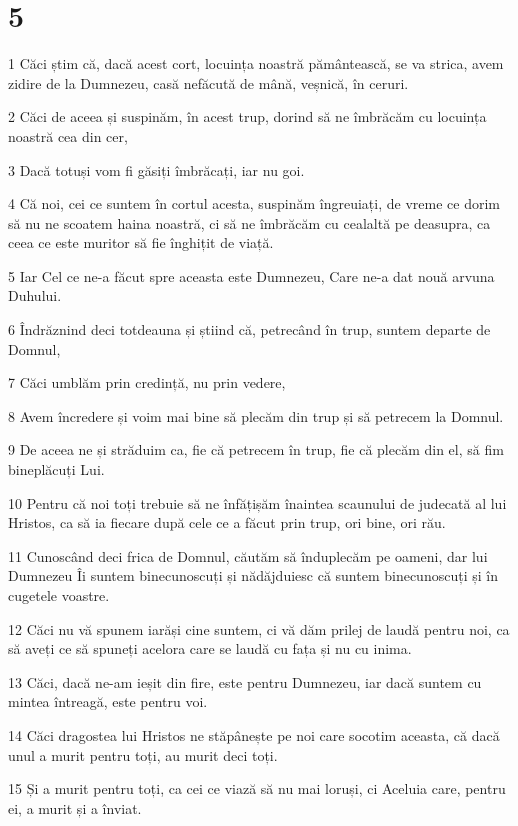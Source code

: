 \chapter{5}

\par 1 Căci știm că, dacă acest cort, locuința noastră pământească, se va strica, avem zidire de la Dumnezeu, casă nefăcută de mână, veșnică, în ceruri.
\par 2 Căci de aceea și suspinăm, în acest trup, dorind să ne îmbrăcăm cu locuința noastră cea din cer,
\par 3 Dacă totuși vom fi găsiți îmbrăcați, iar nu goi.
\par 4 Că noi, cei ce suntem în cortul acesta, suspinăm îngreuiați, de vreme ce dorim să nu ne scoatem haina noastră, ci să ne îmbrăcăm cu cealaltă pe deasupra, ca ceea ce este muritor să fie înghițit de viață.
\par 5 Iar Cel ce ne-a făcut spre aceasta este Dumnezeu, Care ne-a dat nouă arvuna Duhului.
\par 6 Îndrăznind deci totdeauna și știind că, petrecând în trup, suntem departe de Domnul,
\par 7 Căci umblăm prin credință, nu prin vedere,
\par 8 Avem încredere și voim mai bine să plecăm din trup și să petrecem la Domnul.
\par 9 De aceea ne și străduim ca, fie că petrecem în trup, fie că plecăm din el, să fim bineplăcuți Lui.
\par 10 Pentru că noi toți trebuie să ne înfățișăm înaintea scaunului de judecată al lui Hristos, ca să ia fiecare după cele ce a făcut prin trup, ori bine, ori rău.
\par 11 Cunoscând deci frica de Domnul, căutăm să înduplecăm pe oameni, dar lui Dumnezeu Îi suntem binecunoscuți și nădăjduiesc că suntem binecunoscuți și în cugetele voastre.
\par 12 Căci nu vă spunem iarăși cine suntem, ci vă dăm prilej de laudă pentru noi, ca să aveți ce să spuneți acelora care se laudă cu fața și nu cu inima.
\par 13 Căci, dacă ne-am ieșit din fire, este pentru Dumnezeu, iar dacă suntem cu mintea întreagă, este pentru voi.
\par 14 Căci dragostea lui Hristos ne stăpânește pe noi care socotim aceasta, că dacă unul a murit pentru toți, au murit deci toți.
\par 15 Și a murit pentru toți, ca cei ce viază să nu mai loruși, ci Aceluia care, pentru ei, a murit și a înviat.
